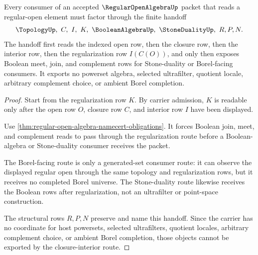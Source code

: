 \begin{theorem}
\label{thm:regular-open-algebra-closure-interior-handoff}
Every consumer of an accepted $\RegularOpenAlgebraUp$ packet that reads a regular-open element must factor through the finite handoff
$$
\TopologyUp,\ C,\ I,\ K,\ \BooleanAlgebraUp,\ \StoneDualityUp,\ R,P,N .
$$
The handoff first reads the indexed open row, then the closure row, then the interior row, then the regularization row $I(C(O))$, and only then exposes Boolean meet, join, and complement rows for Stone-duality or Borel-facing consumers. It exports no powerset algebra, selected ultrafilter, quotient locale, arbitrary complement choice, or ambient Borel completion.
\end{theorem}
\begin{proof}
Start from the regularization row $K$. By carrier admission, $K$ is readable only after the open row $O$, closure row $C$, and interior row $I$ have been displayed.

Use \autoref{thm:regular-open-algebra-namecert-obligations}. It forces Boolean join, meet, and complement reads to pass through the regularization route before a Boolean-algebra or Stone-duality consumer receives the packet.

The Borel-facing route is only a generated-set consumer route: it can observe the displayed regular open through the same topology and regularization rows, but it receives no completed Borel universe. The Stone-duality route likewise receives the Boolean rows after regularization, not an ultrafilter or point-space construction.

The structural rows $R,P,N$ preserve and name this handoff. Since the carrier has no coordinate for host powersets, selected ultrafilters, quotient locales, arbitrary complement choice, or ambient Borel completion, those objects cannot be exported by the closure-interior route.
\end{proof}


